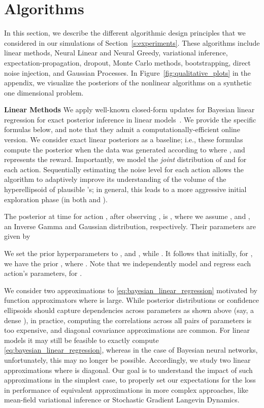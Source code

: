 \documentclass{article} \usepackage{iclr2018_conference,times}
\begin{document}
%
 \section{Algorithms}\label{s:algorithms}

In this section, we describe the different algorithmic design principles that we considered in our simulations of Section~\ref{s:experiments}.
These algorithms include linear methods, Neural Linear and Neural Greedy, variational inference, expectation-propagation, dropout, Monte Carlo methods, bootstrapping, direct noise injection, and Gaussian Processes. 
In Figure~\ref{fig:qualitative_plots} in the appendix, we visualize the posteriors of the nonlinear algorithms on a synthetic one dimensional problem.

\textbf{Linear Methods} We apply well-known closed-form updates for Bayesian linear regression for exact posterior inference in linear models~\citep{bishop2006pattern}.
We provide the specific formulas below, and note that they admit a computationally-efficient online version.  We consider exact linear posteriors as a baseline; i.e., these formulas compute the posterior when the data was generated according to  where , and  represents the reward.
Importantly, we model the \emph{joint} distribution of  and  for each action.
Sequentially estimating the noise level  for each action allows the algorithm to adaptively improve its understanding of the volume of the hyperellipsoid of plausible 's; in general, this leads to a more aggressive initial exploration phase (in both  and ).

The posterior at time  for action , after observing  , is , where we assume , and , an Inverse Gamma and Gaussian distribution, respectively.
Their parameters are given by

We set the prior hyperparameters to , and , while .
It follows that initially, for , we have the prior , where .
Note that we independently model and regress each action's parameters,  for .

We consider two approximations to \eqref{eq:bayesian_linear_regression} motivated by function approximators where  is large. While posterior distributions or confidence ellipsoids should capture dependencies across parameters as shown above (say, a dense ), in practice, computing the correlations across all pairs of parameters is too expensive, and diagonal covariance approximations are common.
For linear models it may still be feasible to exactly compute \eqref{eq:bayesian_linear_regression}, whereas in the case of Bayesian neural networks, unfortunately, this may no longer be possible.
Accordingly, we study two linear approximations where  is diagonal. 
Our goal is to understand the impact of such approximations in the simplest case, to properly set our expectations for the loss in performance of equivalent approximations in more complex approaches, like mean-field variational inference or Stochastic Gradient Langevin Dynamics.
\end{document}
